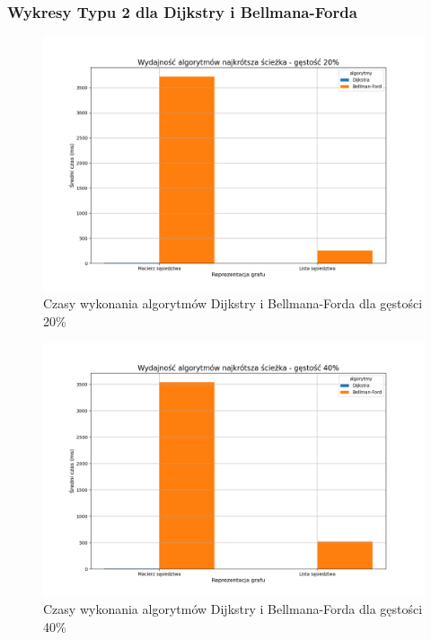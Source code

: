 \documentclass{article}
\begin{document}
\subsubsection{Wykresy Typu 2 dla Dijkstry i Bellmana-Forda}

\begin{figure}[H]
    \centering
    \includegraphics[scale=0.5]{../Python/charts_type2/Typ2_SHORTEST_PATH_gestosc20_wykres.png}
    \caption{Czasy wykonania algorytmów Dijkstry i Bellmana-Forda dla gęstości 20\%}
\end{figure}
\begin{figure}[H]
    \centering
    \includegraphics[scale=0.5]{../Python/charts_type2/Typ2_SHORTEST_PATH_gestosc40_wykres.png}
    \caption{Czasy wykonania algorytmów Dijkstry i Bellmana-Forda dla gęstości 40\%}
\end{figure}
\end{document}
